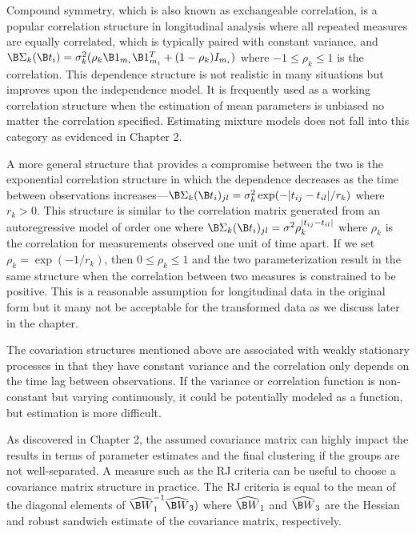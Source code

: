 Compound symmetry, which is also known as exchangeable correlation, is a popular correlation structure in longitudinal analysis where all repeated measures are equally correlated, which is typically paired with constant variance, and $\B \Sigma_{k}(\B t_{i}) = \sigma_{k}^{2}(\rho_{k}\B1_{m_{i}}\B1_{m_{i}}^{T}+(1-\rho_{k})I_{m_{i}})$ where $-1\leq\rho_{k}\leq 1$ is the correlation. This dependence structure is not realistic in  many situations but improves upon the independence model. It is frequently used as a working correlation structure when the estimation of mean parameters is unbiased no matter the correlation specified. Estimating mixture models does not fall into this category as evidenced in Chapter 2.

A more general structure that provides a compromise between the two is the exponential correlation structure in which the dependence decreases as the time between observations increases---$\B \Sigma_{k}(\B t_{i})_{jl} = \sigma_{k}^{2}\exp(-| t_{ij}-t_{il}| / r_{k})$ where $r_{k}> 0$. This structure is similar to the correlation matrix generated from an autoregressive model of order one where $\B\Sigma_{k}(\B t_{i})_{jl} = \sigma^{2}\rho_{k}^{|t_{ij}-t_{il}|}$ where $\rho_{k}$ is the correlation for measurements observed one unit of time apart. If we set $\rho_{k} = \exp(-1/r_{k})$, then $0\leq\rho_{k}\leq1$ and the two parameterization result in the same structure when the correlation between two measures is constrained to be positive. This is a reasonable assumption for longitudinal data in the original form but it many not be acceptable for the transformed data as we discuss later in the chapter.

The covariation structures mentioned above are associated with weakly stationary processes in that they have constant variance and the correlation only depends on the time lag between observations. If the variance or correlation function is non-constant but varying continuously, it could be potentially modeled as a function, but estimation is more difficult.

As discovered in Chapter 2, the assumed covariance matrix can highly impact the results in terms of parameter estimates and the final clustering if the groups are not well-separated. A measure such as the RJ criteria can be useful to choose a covariance matrix structure in practice. The RJ criteria is equal to the mean of the diagonal elements of $\widehat{\B W}_{1}^{-1}\widehat{\B W}_{3})$ where $\widehat{\B W}_{1}$ and $\widehat{\B W}_{3}$ are the Hessian and robust sandwich estimate of the covariance matrix, respectively.  

